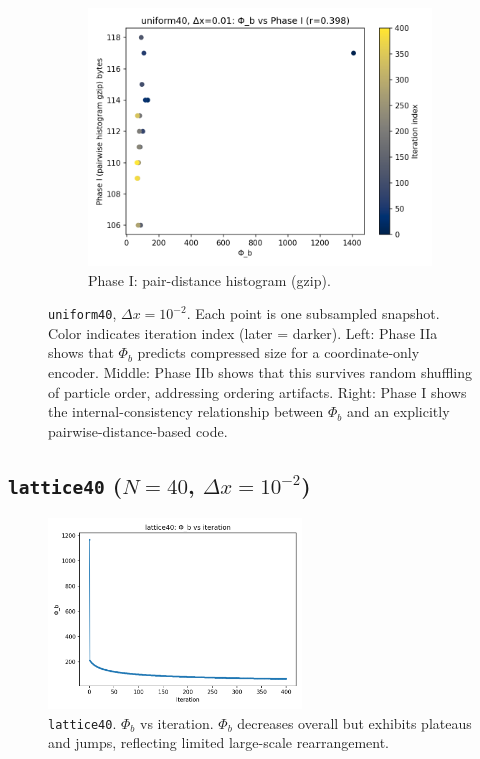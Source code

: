 \documentclass[11pt,a4paper]{article}
\numberwithin{equation}{section}
\newcommand{\phib}{\Phi_b}
\begin{document}
\begin{figure}[h!]
\begin{subfigure}[b]{0.32\textwidth}
\includegraphics[width=\textwidth]{figures/uniform40_dx0.01_phib_vs_phase1.png}
\caption{Phase I: pair-distance histogram (gzip).}
\end{subfigure}
\caption{\texttt{uniform40}, $\Delta x{=}10^{-2}$. Each point is one subsampled snapshot. Color indicates iteration index (later = darker). Left: Phase IIa shows that $\phib$ predicts compressed size for a coordinate-only encoder. Middle: Phase IIb shows that this survives random shuffling of particle order, addressing ordering artifacts. Right: Phase I shows the internal-consistency relationship between $\phib$ and an explicitly pairwise-distance-based code.}
\label{fig:uniform40_corr}
\end{figure}

\subsection{\texttt{lattice40} ($N{=}40$, $\Delta x = 10^{-2}$)}
\begin{figure}[h!]
\centering
\includegraphics[width=0.6\textwidth]{figures/lattice40_dx0.01_phib_vs_iter.png}
\caption{\texttt{lattice40}. $\phib$ vs iteration. $\phib$ decreases overall but exhibits plateaus and jumps, reflecting limited large-scale rearrangement.}
\label{fig:lattice40_iter}
\end{figure}
\end{document}
